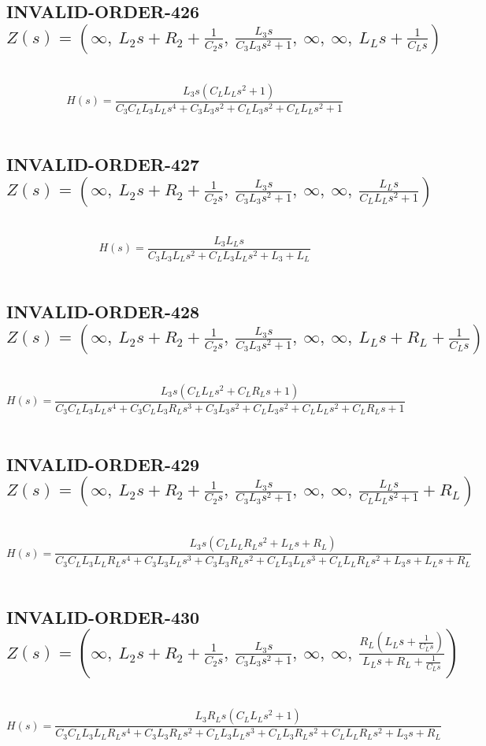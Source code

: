 \documentclass{article}
\begin{document}
\subsection{INVALID-ORDER-426 $Z(s) = \left( \infty, \  L_{2} s + R_{2} + \frac{1}{C_{2} s}, \  \frac{L_{3} s}{C_{3} L_{3} s^{2} + 1}, \  \infty, \  \infty, \  L_{L} s + \frac{1}{C_{L} s}\right)$ } \ 
\textbf{\[H(s) = \frac{L_{3} s \left(C_{L} L_{L} s^{2} + 1\right)}{C_{3} C_{L} L_{3} L_{L} s^{4} + C_{3} L_{3} s^{2} + C_{L} L_{3} s^{2} + C_{L} L_{L} s^{2} + 1}\] } \ 
\subsection{INVALID-ORDER-427 $Z(s) = \left( \infty, \  L_{2} s + R_{2} + \frac{1}{C_{2} s}, \  \frac{L_{3} s}{C_{3} L_{3} s^{2} + 1}, \  \infty, \  \infty, \  \frac{L_{L} s}{C_{L} L_{L} s^{2} + 1}\right)$ } \ 
\textbf{\[H(s) = \frac{L_{3} L_{L} s}{C_{3} L_{3} L_{L} s^{2} + C_{L} L_{3} L_{L} s^{2} + L_{3} + L_{L}}\] } \ 
\subsection{INVALID-ORDER-428 $Z(s) = \left( \infty, \  L_{2} s + R_{2} + \frac{1}{C_{2} s}, \  \frac{L_{3} s}{C_{3} L_{3} s^{2} + 1}, \  \infty, \  \infty, \  L_{L} s + R_{L} + \frac{1}{C_{L} s}\right)$ } \ 
\textbf{\[H(s) = \frac{L_{3} s \left(C_{L} L_{L} s^{2} + C_{L} R_{L} s + 1\right)}{C_{3} C_{L} L_{3} L_{L} s^{4} + C_{3} C_{L} L_{3} R_{L} s^{3} + C_{3} L_{3} s^{2} + C_{L} L_{3} s^{2} + C_{L} L_{L} s^{2} + C_{L} R_{L} s + 1}\] } \ 
\subsection{INVALID-ORDER-429 $Z(s) = \left( \infty, \  L_{2} s + R_{2} + \frac{1}{C_{2} s}, \  \frac{L_{3} s}{C_{3} L_{3} s^{2} + 1}, \  \infty, \  \infty, \  \frac{L_{L} s}{C_{L} L_{L} s^{2} + 1} + R_{L}\right)$ } \ 
\textbf{\[H(s) = \frac{L_{3} s \left(C_{L} L_{L} R_{L} s^{2} + L_{L} s + R_{L}\right)}{C_{3} C_{L} L_{3} L_{L} R_{L} s^{4} + C_{3} L_{3} L_{L} s^{3} + C_{3} L_{3} R_{L} s^{2} + C_{L} L_{3} L_{L} s^{3} + C_{L} L_{L} R_{L} s^{2} + L_{3} s + L_{L} s + R_{L}}\] } \ 
\subsection{INVALID-ORDER-430 $Z(s) = \left( \infty, \  L_{2} s + R_{2} + \frac{1}{C_{2} s}, \  \frac{L_{3} s}{C_{3} L_{3} s^{2} + 1}, \  \infty, \  \infty, \  \frac{R_{L} \left(L_{L} s + \frac{1}{C_{L} s}\right)}{L_{L} s + R_{L} + \frac{1}{C_{L} s}}\right)$ } \ 
\textbf{\[H(s) = \frac{L_{3} R_{L} s \left(C_{L} L_{L} s^{2} + 1\right)}{C_{3} C_{L} L_{3} L_{L} R_{L} s^{4} + C_{3} L_{3} R_{L} s^{2} + C_{L} L_{3} L_{L} s^{3} + C_{L} L_{3} R_{L} s^{2} + C_{L} L_{L} R_{L} s^{2} + L_{3} s + R_{L}}\] } \ 
\end{document}
